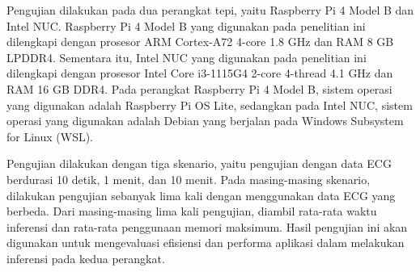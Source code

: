 Pengujian dilakukan pada dua perangkat tepi, yaitu Raspberry Pi 4 Model B dan Intel NUC.
Raspberry Pi 4 Model B yang digunakan pada penelitian ini dilengkapi dengan prosesor ARM Cortex-A72 4-core 1.8 GHz dan RAM 8 GB LPDDR4.
Sementara itu, Intel NUC yang digunakan pada penelitian ini dilengkapi dengan prosesor Intel Core i3-1115G4 2-core 4-thread 4.1 GHz dan RAM 16 GB DDR4.
Pada perangkat Raspberry Pi 4 Model B, sistem operasi yang digunakan adalah Raspberry Pi OS Lite, sedangkan pada Intel NUC, sistem operasi yang digunakan adalah Debian yang berjalan pada Windows Subsystem for Linux (WSL).

Pengujian dilakukan dengan tiga skenario, yaitu pengujian dengan data ECG berdurasi 10 detik, 1 menit, dan 10 menit. 
Pada masing-masing skenario, dilakukan pengujian sebanyak lima kali dengan menggunakan data ECG yang berbeda.
Dari masing-masing lima kali pengujian, diambil rata-rata waktu inferensi dan rata-rata penggunaan memori maksimum.
Hasil pengujian ini akan digunakan untuk mengevaluasi efisiensi dan performa aplikasi dalam melakukan inferensi pada kedua perangkat.
%
